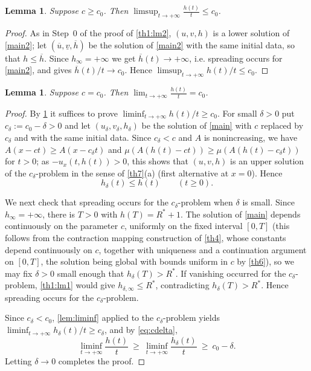 \documentclass[reqno]{amsart}
\theoremstyle{plain}
\newtheorem{lemma}[theorem]{Lemma}
\theoremstyle{definition}
\theoremstyle{remark}
\begin{document}
\begin{lemma}\label{lm:limsup_c0}
	Suppose $c\ge c_0$. Then $\displaystyle\limsup_{t\to+\infty}\frac{h(t)}{t}\le c_0$.
\end{lemma}

\begin{proof}
	As in Step~0 of the proof of \cref{th1:lm2}, $(u,v,h)$ is a lower solution of
	\eqref{main2}; let $(\overline u,\underline v,\overline h)$ be the solution of
	\eqref{main2} with the same initial data, so that $h\le\overline h$. Since
	$h_\infty=+\infty$ we get $\overline h(t)\to+\infty$, i.e. spreading occurs
	for \eqref{main2}, and \cite[Theorem 1.3]{MR3986328} gives
	$\overline h(t)/t\to c_0$. Hence $\limsup_{t\to+\infty}h(t)/t\le c_0$.
\end{proof}

\begin{lemma}\label{lm:eq}
	Suppose $c = c_0$. Then $\displaystyle\lim_{t\to+\infty} \frac{h(t)}{t} = c_0$.
\end{lemma}

\begin{proof}
	By \cref{lm:limsup_c0} it suffices to prove
	$\liminf_{t\to+\infty}h(t)/t\ge c_0$. For small $\delta>0$ put
	$c_\delta:=c_0-\delta>0$ and let $(u_\delta,v_\delta,h_\delta)$ be the
	solution of \eqref{main} with $c$ replaced by $c_\delta$ and with the same
	initial data. Since $c_\delta<c$ and $A$ is nonincreasing, we have
	$A(x-ct)\ge A(x-c_\delta t)$ and $\mu(A(h(t)-ct))\ge\mu(A(h(t)-c_\delta t))$
	for $t>0$; as $-u_x(t,h(t))>0$, this shows that $(u,v,h)$ is an upper solution
	of the $c_\delta$-problem in the sense of \cref{th7}(a) (first alternative at
	$x=0$). Hence
	\begin{equation}\label{eq:cdelta}
		h_\delta(t)\le h(t)\qquad (t\ge0).
	\end{equation}

	We next check that spreading occurs for the $c_\delta$-problem when $\delta$
	is small. Since $h_\infty=+\infty$, there is $T>0$ with $h(T)=R^*+1$. The
	solution of \eqref{main} depends continuously on the parameter $c$, uniformly
	on the fixed interval $[0,T]$ (this follows from the contraction mapping
	construction of \cref{th4}, whose constants depend continuously on $c$,
	together with uniqueness and a continuation argument on $[0,T]$, the solution
	being global with bounds uniform in $c$ by \cref{th6}), so we may fix
	$\delta>0$ small enough that $h_\delta(T)>R^*$. If vanishing occurred for the
	$c_\delta$-problem, \cref{th1:lm1} would give $h_{\delta,\infty}\le R^*$,
	contradicting $h_\delta(T)>R^*$. Hence spreading occurs for the
	$c_\delta$-problem.

	Since $c_\delta<c_0$, \cref{lem:liminf} applied to the $c_\delta$-problem
	yields $\liminf_{t\to+\infty}h_\delta(t)/t\ge c_\delta$, and by
	\eqref{eq:cdelta},
	\[
	\liminf_{t\to+\infty}\frac{h(t)}{t}\ \ge\ \liminf_{t\to+\infty}\frac{h_\delta(t)}{t}\ \ge\ c_0-\delta .
	\]
	Letting $\delta\to0$ completes the proof.
\end{proof}
\end{document}
